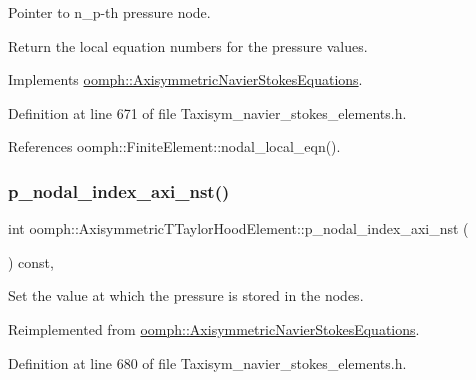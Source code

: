 Pointer to n\+\_\+p-\/th pressure node. 

Return the local equation numbers for the pressure values. 

Implements \hyperlink{classoomph_1_1AxisymmetricNavierStokesEquations_ad6ac62ca5fa411c365fd2ecc72aa25e8}{oomph\+::\+Axisymmetric\+Navier\+Stokes\+Equations}.



Definition at line 671 of file Taxisym\+\_\+navier\+\_\+stokes\+\_\+elements.\+h.



References oomph\+::\+Finite\+Element\+::nodal\+\_\+local\+\_\+eqn().

\mbox{\label{classoomph_1_1AxisymmetricTTaylorHoodElement_a27deacb53ba98601b20dd06d9c812520}} 
\subsubsection{\texorpdfstring{p\+\_\+nodal\+\_\+index\+\_\+axi\+\_\+nst()}{p\_nodal\_index\_axi\_nst()}}
{\footnotesize\ttfamily int oomph\+::\+Axisymmetric\+T\+Taylor\+Hood\+Element\+::p\+\_\+nodal\+\_\+index\+\_\+axi\+\_\+nst (\begin{DoxyParamCaption}{ }\end{DoxyParamCaption}) const\hspace{0.3cm}{\ttfamily [inline]}, {\ttfamily [virtual]}}



Set the value at which the pressure is stored in the nodes. 



Reimplemented from \hyperlink{classoomph_1_1AxisymmetricNavierStokesEquations_a47c61dbb8a32fd785c99ab3aa8bc35f9}{oomph\+::\+Axisymmetric\+Navier\+Stokes\+Equations}.



Definition at line 680 of file Taxisym\+\_\+navier\+\_\+stokes\+\_\+elements.\+h.

\mbox{\label{classoomph_1_1AxisymmetricTTaylorHoodElement_ab340da6c7f125bba62b3234993890cd0}} 
